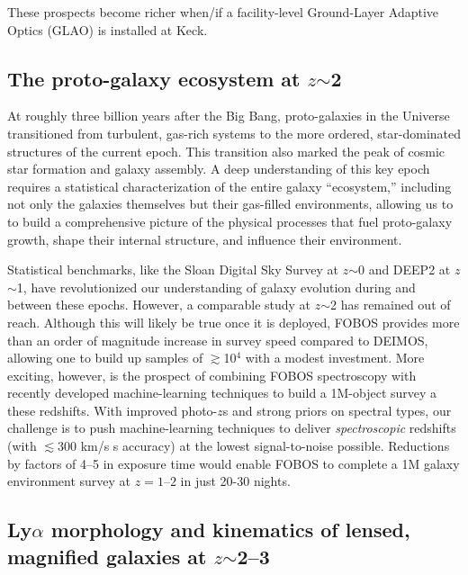 These prospects become richer when/if a facility-level Ground-Layer
Adaptive Optics (GLAO) is installed at Keck.

\noindent{}

\subsection{The proto-galaxy ecosystem at $z$$\sim$2}
\label{sec:z2galaxies}

At roughly three billion years after the Big Bang, proto-galaxies in
the Universe transitioned from turbulent, gas-rich systems to the
more ordered, star-dominated structures of the current epoch. This
transition also marked the peak of cosmic star formation and galaxy
assembly. A deep understanding of this key epoch requires a
statistical characterization of the entire galaxy ``ecosystem,''
including not only the galaxies themselves but their gas-filled
environments, allowing us to to build a comprehensive picture of the
physical processes that fuel proto-galaxy growth, shape their
internal structure, and influence their environment.

Statistical benchmarks, like the Sloan Digital Sky Survey
\citep[SDSS][]{2000AJ....120.1579Y} at $z$$\sim$0 and DEEP2
\citep{2003SPIE.4834..161D, 2013ApJS..208....5N} at $z$$\sim$1, have
revolutionized our understanding of galaxy evolution during and
between these epochs. However, a comparable study at $z$$\sim$2 has
remained out of reach.  Although this will likely be true once it is deployed,
FOBOS provides more than an order of
magnitude increase in survey speed compared to DEIMOS, allowing one
to build up samples of $\gtrsim$10$^4$ with a modest investment. More
exciting, however, is the prospect of combining FOBOS spectroscopy
with recently developed machine-learning techniques to build a
1M-object survey a these redshifts.  With improved photo-$z$s and strong priors on
spectral types, our challenge is to push machine-learning
techniques to deliver {\it spectroscopic} redshifts (with $\lesssim$300 km/s
s accuracy) at the lowest signal-to-noise possible. Reductions
by factors of 4--5 in exposure time would enable FOBOS to complete a
1M galaxy environment survey at $z=1$--$2$ in just 20-30 nights.

\noindent{}

\subsection{Ly$\alpha$ morphology and kinematics of lensed, magnified
galaxies at $z$$\sim$2--3}

